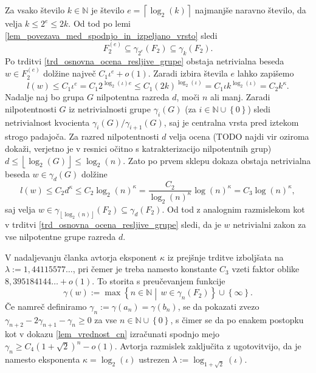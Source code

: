 \begin{dokaz}
    Za vsako število $k \in  \mathbb{N}$ je
    število $e = \left\lceil \log_2(k) \right\rceil$ najmanjše naravno število, da velja $k \le 2^{e} \le 2k$.
    Od tod po lemi \ref{lem_povezava_med_spodnjo_in_izpeljano_vrsto} sledi \begin{equation*}
    F_2^{(e)} \subseteq \gamma_{2^{e}}(F_2) \subseteq \gamma_k(F_2).
    \end{equation*}  
     Po trditvi \ref{trd_osnovna_ocena_resljive_grupe} obstaja netrivialna beseda $w \in  F_2^{(e)}$ dolžine največ $C_1 \iota^{e} + o(1)$.
    Zaradi izbira števila $e$ lahko zapišemo \begin{equation*}
    l(w) \le  C_1 \iota^{e} = C_1 2^{\log_2(\iota) e} \le C_1 (2k)^{\log_2(\iota)} = C_1 \iota k^{\log_2(\iota)} = C_2  k^\kappa.
    \end{equation*}
    Nadalje naj bo grupa $G$ nilpotentna razreda $d$, moči $n$ ali manj. Zaradi nilpotentnosti $G$ iz netrivialnosti grupe $\gamma_i(G)$ (za $i \in \mathbb{N} \cup \left\{ 0 \right\}$) sledi netrivialnost kvocienta $\gamma_i(G) / \gamma_{i + 1}(G)$, saj je centralna vrsta pred iztekom strogo padajoča.
    Za razred nilpotentnosti $d$ velja ocena (TODO najdi vir oziroma dokaži, verjetno je v resnici očitno s katrakterizacijo nilpotentnih grup) $d \le \left\lfloor \log_2(G)  \right\rfloor \le \log_2(n)$. Zato po prvem sklepu dokaza obstaja netrivialna beseda $w \in \gamma_d(G)$ dolžine \begin{equation*}
    l(w) \le C_2 d^{\kappa} \le C_2 \log_2(n)^{\kappa} = \frac{C_2}{\log_2(n)^{\kappa}} \log(n)^{\kappa} = C_3 \log(n)^{\kappa}, 
    \end{equation*}  
     saj velja $w \in \gamma_{\left\lfloor \log_2(n) \right\rfloor}(F_2) \subseteq \gamma_{d}(F_2)$. Od tod z analognim razmislekom kot v trditvi \ref{trd_osnovna_ocena_resljive_grupe} sledi, da je $w$ netrivialni zakon za vse nilpotentne grupe razreda $d$. 
\end{dokaz}

V nadaljevanju članka \cite{Elkasapy_Thom_2013} avtorja eksponent $\kappa$ iz prejšnje trditve izboljšata na $\lambda := 1{,}44115577 \ldots$, pri čemer je treba namesto konstante $C_3$ vzeti faktor oblike $8{,}395184144 \ldots + o(1)$. To storita s preučevanjem funkcije \begin{equation*}
\gamma(w) := \max \left\{ n \in  \mathbb{N}  \middle|\, w \in \gamma_{n}(F_2) \right\} \cup \left\{ \infty\right\}. 
\end{equation*}  
Če namreč definiramo $\gamma_n := \gamma(a_{n}) = \gamma(b_{n})$, se da pokazati zvezo $\gamma_{n + 2} - 2 \gamma_{n+1}  - \gamma_{n} \ge  0$ za vse $n \in  \mathbb{N} \cup \left\{ 0\right\}$, s čimer se da po enakem postopku kot v dokazu \ref*{lem_vrednost_cn} izračunati spodnjo mejo $\gamma_n \ge C_4 (1 + \sqrt{2})^{n} - o(1)$.
Avtorja razmislek zaključita z ugotovitvijo, da je namesto eksponenta $\kappa = \log_2( \iota)$ ustrezen $\lambda := \log_{1 + \sqrt{2}}(\iota)$.


